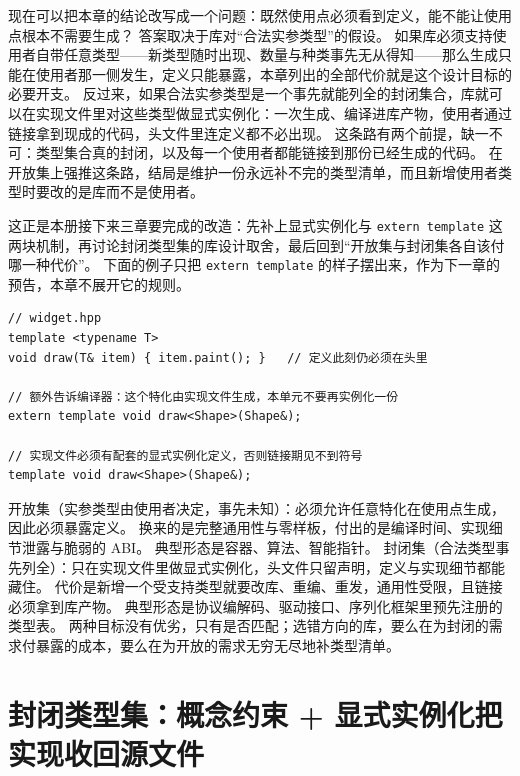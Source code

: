 \documentclass[12pt,a4paper,fontset=fandol]{ctexbook}
\newcommand{\kw}[1]{\texttt{#1}}
\begin{document}
现在可以把本章的结论改写成一个问题：既然使用点必须看到定义，能不能让使用点根本不需要生成？
答案取决于库对“合法实参类型”的假设。
如果库必须支持使用者自带任意类型——新类型随时出现、数量与种类事先无从得知——那么生成只能在使用者那一侧发生，定义只能暴露，本章列出的全部代价就是这个设计目标的必要开支。
反过来，如果合法实参类型是一个事先就能列全的封闭集合，库就可以在实现文件里对这些类型做显式实例化：一次生成、编译进库产物，使用者通过链接拿到现成的代码，头文件里连定义都不必出现。
这条路有两个前提，缺一不可：类型集合真的封闭，以及每一个使用者都能链接到那份已经生成的代码。
在开放集上强推这条路，结局是维护一份永远补不完的类型清单，而且新增使用者类型时要改的是库而不是使用者。

这正是本册接下来三章要完成的改造：先补上显式实例化与 \kw{extern template} 这两块机制，再讨论封闭类型集的库设计取舍，最后回到“开放集与封闭集各自该付哪一种代价”。
下面的例子只把 \kw{extern template} 的样子摆出来，作为下一章的预告，本章不展开它的规则。

\begin{lstlisting}[style=cppstyle,caption={预告：extern template 声明的样子（机制细节见下一章）}]
// widget.hpp
template <typename T>
void draw(T& item) { item.paint(); }   // 定义此刻仍必须在头里

// 额外告诉编译器：这个特化由实现文件生成，本单元不要再实例化一份
extern template void draw<Shape>(Shape&);

// 实现文件必须有配套的显式实例化定义，否则链接期见不到符号
template void draw<Shape>(Shape&);
\end{lstlisting}

\begin{compare}[title={开放集与封闭集：两种库设计目标}]
开放集（实参类型由使用者决定，事先未知）：必须允许任意特化在使用点生成，因此必须暴露定义。
换来的是完整通用性与零样板，付出的是编译时间、实现细节泄露与脆弱的 ABI。
典型形态是容器、算法、智能指针。
封闭集（合法类型事先列全）：只在实现文件里做显式实例化，头文件只留声明，定义与实现细节都能藏住。
代价是新增一个受支持类型就要改库、重编、重发，通用性受限，且链接必须拿到库产物。
典型形态是协议编解码、驱动接口、序列化框架里预先注册的类型表。
两种目标没有优劣，只有是否匹配；选错方向的库，要么在为封闭的需求付暴露的成本，要么在为开放的需求无穷无尽地补类型清单。
\end{compare}

\chapter{封闭类型集：概念约束 + 显式实例化把实现收回源文件}
\end{document}
